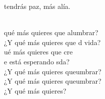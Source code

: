 \documentclass[12pt]{article}
\begin{document}
\begin{multicols*}{2}
\begin{cancion}
	tendrás paz, más alía.\\\jump\\
	\begin{chorus}%
	 qué más quieres que alumbrar?\\
	¿Y qué más quieres que d vida?\\
	ué más quieres que cre \\
	e está esperando sda?\\
\jump
	¿Y qué más quieres queumbrar?\\
	¿Y qué más quieres queumbrar?\\
¿Y qué más quieres?\\
	\end{chorus}%
	\jump\\
\end{cancion}%


\end{multicols*}
\end{document}
